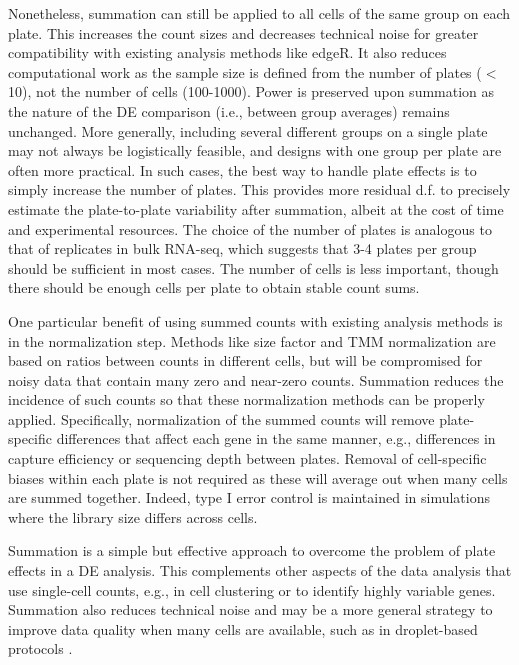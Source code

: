\documentclass{article}
\begin{document}
Nonetheless, summation can still be applied to all cells of the same group on each plate.
This increases the count sizes and decreases technical noise for greater compatibility with existing analysis methods like edgeR.
It also reduces computational work as the sample size is defined from the number of plates ($<$ 10), not the number of cells (100-1000).
Power is preserved upon summation as the nature of the DE comparison (i.e., between group averages) remains unchanged.
More generally, including several different groups on a single plate may not always be logistically feasible, and designs with one group per plate are often more practical.
In such cases, the best way to handle plate effects is to simply increase the number of plates.
This provides more residual d.f. to precisely estimate the plate-to-plate variability after summation, albeit at the cost of time and experimental resources.
The choice of the number of plates is analogous to that of replicates in bulk RNA-seq, which suggests that 3-4 plates per group should be sufficient in most cases.
The number of cells is less important, though there should be enough cells per plate to obtain stable count sums.

One particular benefit of using summed counts with existing analysis methods is in the normalization step.
Methods like size factor and TMM normalization are based on ratios between counts in different cells,
    but will be compromised for noisy data that contain many zero and near-zero counts.
Summation reduces the incidence of such counts so that these normalization methods can be properly applied.
Specifically, normalization of the summed counts will remove plate-specific differences that affect each gene in the same manner, 
    e.g., differences in capture efficiency or sequencing depth between plates.
Removal of cell-specific biases within each plate is not required as these will average out when many cells are summed together.
Indeed, type I error control is maintained in simulations where the library size differs across cells.


Summation is a simple but effective approach to overcome the problem of plate effects in a DE analysis. 
This complements other aspects of the data analysis that use single-cell counts, e.g., in cell clustering or to identify highly variable genes.
Summation also reduces technical noise and may be a more general strategy to improve data quality when many cells are available,
    such as in droplet-based protocols \cite{klein2015droplet,macosko2015highly}.



\end{document}
